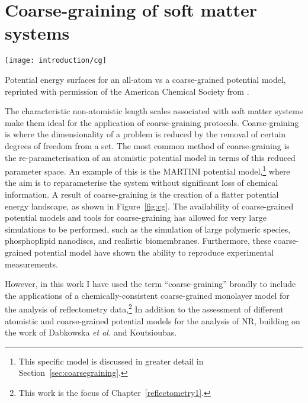 \section{Coarse-graining of soft matter systems}
%
\begin{marginfigure}
    \texttt{[image: introduction/cg]}
    \caption{Potential energy surfaces for an all-atom vs a coarse-grained potential model, reprinted with permission of the American Chemical Society from \cite{kmiecik_coarse-grained_2016}.}
    \label{fig:cg}
\end{marginfigure}
%
The characteristic non-atomistic length scales associated with soft matter systems make them ideal for the application of coarse-graining protocols.
Coarse-graining is where the dimensionality of a problem is reduced by the removal of certain degrees of freedom from a set.
The most common method of coarse-graining is the re-parameterisation of an atomistic potential model in terms of this reduced parameter space.
An example of this is the MARTINI potential model,\footnote{This specific model is discussed in greater detail in Section~\ref{sec:coarsegraining}.} where the aim is to reparameterise the system without significant loss of chemical information.\autocite{marrink_martini_2007}
A result of coarse-graining is the creation of a flatter potential energy landscape, as shown in Figure~\ref{fig:cg}.
The availability of coarse-grained potential models and tools for coarse-graining has allowed for very large simulations to be performed, such as the simulation of large polymeric species,\autocite{carbone_transferability_2008} phosphoplipid nanodiscs,\autocite{xue_molecular_2018} and realistic biomembranes.\autocite{marrink_computational_2019}
Furthermore, these coarse-grained potential model have shown the ability to reproduce experimental measurements.\autocite{negro_experimental_2014,nawaz_interactions_2012}

However, in this work I have used the term ``coarse-graining'' broadly to include the applications of a chemically-consistent coarse-grained monolayer model for the analysis of reflectometry data,\footnote{This work is the focus of Chapter~\ref{reflectometry1}.}
In addition to the assessment of different atomistic and coarse-grained potential models for the analysis of NR, building on the work of Dabkowska \emph{et al.} and Koutsioubas.\autocite[][also see Chapter~\ref{reflectometry2}]{dabkowska_modulation_2014,koutsioubas_combined_2016}
